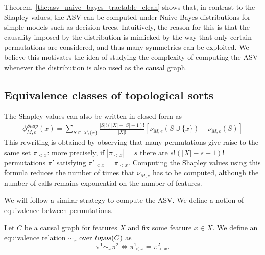 Theorem~\ref{the:asv_naive_bayes_tractable_clean} shows that, in contrast to the Shapley values, the ASV can be computed under Naive Bayes distributions for simple models such as decision trees. Intuitively, the reason for this is that the causality imposed by the distribution is mimicked by the way that only certain permutations are considered,
 and thus many symmetries can be exploited. We believe this motivates the idea of studying the complexity of computing the ASV whenever the distribution is also used as the causal graph. 

\subsection{Equivalence classes of topological sorts}

The Shapley values can also be written in closed form as
%
\begin{align*}
	\phi^{Shap}_{M,e}(x) = \sum_{S \subseteq X \setminus \{x\}} \frac{|S|!(|X|-|S|-1)!}{|X|!}\left[\nu_{M,e}(S \cup \{x\}) - \nu_{M,e}(S)\right] 
\end{align*}
%
This rewriting is obtained by observing that many permutations give raise to the same set $\pi_{<x}$: more precisely, if $|\pi_{<x}| = s$ there are $s!(|X|-s-1)!$ permutations $\pi'$ satisfying $\pi'_{<x} = \pi_{<x}$. Computing the Shapley values using this formula reduces the number of times that $\nu_{M,e}$ has to be computed, although the number of calls remains
exponential on the number of features.

We will follow a similar strategy to compute the ASV. We define a notion of equivalence between permutations.

\begin{definition}\label{def:equiv_relation_left_right}
	Let $C$ be a causal graph for features $X$ and fix some feature $x \in X$. We define an equivalence relation $\sim_x$ over $topos(C)$ as
	\[
	\pi^1 \sim_x \pi^2
	\iff
	\pi^1_{<x}=\pi^2_{<x}.
	\]
\end{definition}

